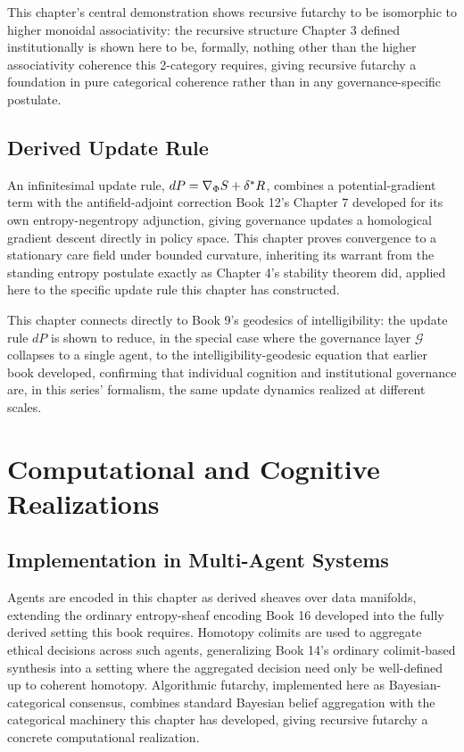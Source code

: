 This chapter's central demonstration shows recursive futarchy to be isomorphic to higher monoidal associativity: the recursive structure Chapter 3 defined institutionally is shown here to be, formally, nothing other than the higher associativity coherence this 2-category requires, giving recursive futarchy a foundation in pure categorical coherence rather than in any governance-specific postulate.

\chapter{Derived Update Rule}

An infinitesimal update rule, $dP = \nabla_{\Phi} S + \delta^{*} R$, combines a potential-gradient term with the antifield-adjoint correction Book 12's Chapter 7 developed for its own entropy-negentropy adjunction, giving governance updates a homological gradient descent directly in policy space. This chapter proves convergence to a stationary care field under bounded curvature, inheriting its warrant from the standing entropy postulate exactly as Chapter 4's stability theorem did, applied here to the specific update rule this chapter has constructed.

This chapter connects directly to Book 9's geodesics of intelligibility: the update rule $dP$ is shown to reduce, in the special case where the governance layer $\mathcal{G}$ collapses to a single agent, to the intelligibility-geodesic equation that earlier book developed, confirming that individual cognition and institutional governance are, in this series' formalism, the same update dynamics realized at different scales.

\part{Computational and Cognitive Realizations}

\chapter{Implementation in Multi-Agent Systems}

Agents are encoded in this chapter as derived sheaves over data manifolds, extending the ordinary entropy-sheaf encoding Book 16 developed into the fully derived setting this book requires. Homotopy colimits are used to aggregate ethical decisions across such agents, generalizing Book 14's ordinary colimit-based synthesis into a setting where the aggregated decision need only be well-defined up to coherent homotopy. Algorithmic futarchy, implemented here as Bayesian-categorical consensus, combines standard Bayesian belief aggregation with the categorical machinery this chapter has developed, giving recursive futarchy a concrete computational realization.

